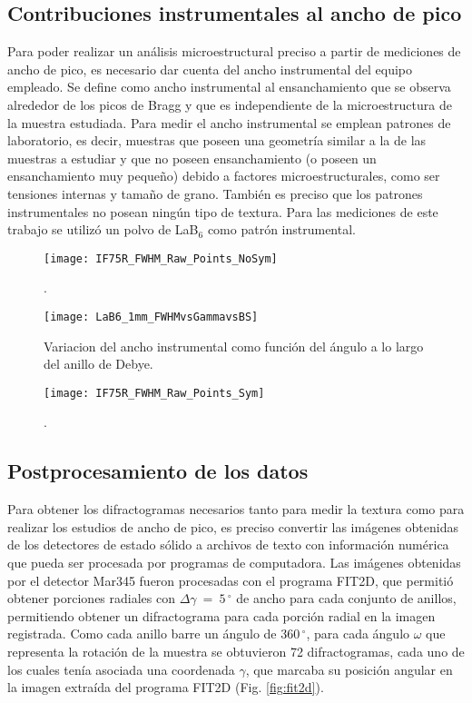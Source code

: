 \subsection{Contribuciones instrumentales al ancho de pico}\label{SS:inst}
Para poder realizar un análisis microestructural preciso a partir de mediciones de ancho de pico, es necesario dar cuenta del ancho instrumental del equipo empleado.
Se define como ancho instrumental al ensanchamiento que se observa alrededor de los picos de Bragg y que es independiente de la microestructura de la muestra estudiada.
Para medir el ancho instrumental se emplean patrones de laboratorio, es decir, muestras que poseen una geometría similar a la de las muestras a estudiar y que no poseen ensanchamiento (o poseen un ensanchamiento muy pequeño) debido a factores microestructurales, como ser tensiones internas y tamaño de grano.
También es preciso que los patrones instrumentales no posean ningún tipo de textura.
Para las mediciones de este trabajo se utilizó un polvo de LaB$_6$ como patrón instrumental.

\begin{figure}[!htb]
  \centering
  \texttt{[image: IF75R\_FWHM\_Raw\_Points\_NoSym]}
  \caption{.}
  \label{fig:IF75NoSym}
\end{figure}


\begin{figure}[!htb]
  \centering
  \texttt{[image: LaB6\_1mm\_FWHMvsGammavsBS]}
  \caption{Variacion del ancho instrumental como función del ángulo a lo largo del anillo de Debye.}
  \label{fig:LaB6vsGamma}
\end{figure}

\begin{figure}[!htb]
  \centering
  \texttt{[image: IF75R\_FWHM\_Raw\_Points\_Sym]}
  \caption{.}
  \label{fig:IF75Sym}
\end{figure}

\newpage
\subsection{Postprocesamiento de los datos}\label{SS:MatPost}
Para obtener los difractogramas necesarios tanto para medir la textura como para realizar los estudios de ancho de pico, es preciso convertir las imágenes obtenidas de los detectores de estado sólido a archivos de texto con información numérica que pueda ser procesada por programas de computadora.
Las imágenes obtenidas por el detector Mar345 fueron procesadas con el programa FIT2D\cite{FIT2D}, que permitió obtener porciones radiales con $\Delta \gamma \ = \ 5\,^{\circ}$ de ancho para cada conjunto de anillos, permitiendo obtener un difractograma para cada porción radial en la imagen registrada.
Como cada anillo barre un ángulo de 360\,$^{\circ}$, para cada ángulo $\omega$ que representa la rotación de la muestra se obtuvieron 72 difractogramas, cada uno de los cuales tenía asociada una coordenada $\gamma$, que marcaba su posición angular en la imagen extraída del programa FIT2D (Fig. \ref{fig:fit2d}).

